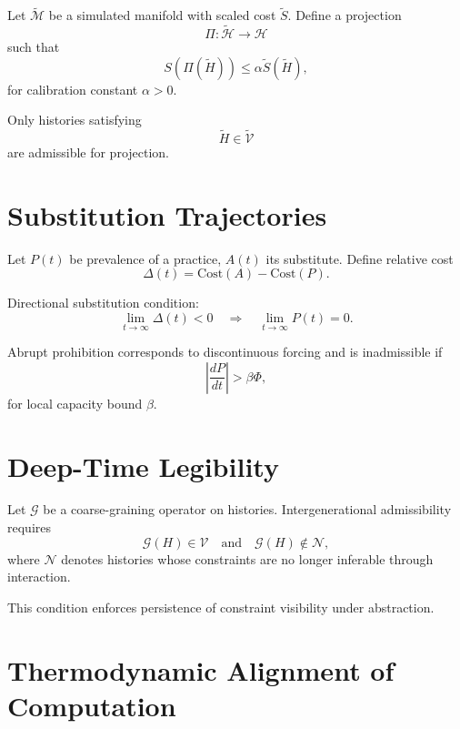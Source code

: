 \documentclass[12pt,oneside]{book}
\begin{document}
Let \(\tilde{\mathcal{M}}\) be a simulated manifold with scaled cost \(\tilde{S}\).
Define a projection
\[
\Pi : \tilde{\mathcal{H}} \to \mathcal{H}
\]
such that
\begin{equation}
S(\Pi(\tilde{H})) \le \alpha \tilde{S}(\tilde{H}),
\end{equation}
for calibration constant \(\alpha > 0\).

Only histories satisfying
\begin{equation}
\tilde{H} \in \tilde{\mathcal{V}}
\end{equation}
are admissible for projection.

\chapter{Substitution Trajectories}

Let \(P(t)\) be prevalence of a practice, \(A(t)\) its substitute.
Define relative cost
\[
\Delta(t) = \text{Cost}(A) - \text{Cost}(P).
\]

Directional substitution condition:
\begin{equation}
\lim_{t\to\infty} \Delta(t) < 0
\quad \Rightarrow \quad
\lim_{t\to\infty} P(t) = 0.
\end{equation}

Abrupt prohibition corresponds to discontinuous forcing and is inadmissible if
\begin{equation}
\left|\frac{dP}{dt}\right| > \beta \Phi,
\end{equation}
for local capacity bound \(\beta\).

\chapter{Deep-Time Legibility}

Let \(\mathcal{G}\) be a coarse-graining operator on histories.
Intergenerational admissibility requires
\begin{equation}
\mathcal{G}(H) \in \mathcal{V}
\quad \text{and} \quad
\mathcal{G}(H) \notin \mathcal{N},
\end{equation}
where \(\mathcal{N}\) denotes histories whose constraints are no longer inferable through interaction.

This condition enforces persistence of constraint visibility under abstraction.

\chapter{Thermodynamic Alignment of Computation}
\end{document}
